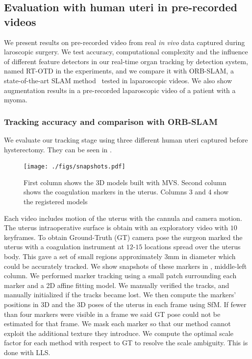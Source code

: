 \subsection{Evaluation with human uteri in pre-recorded videos}
We present results on pre-recorded video from real \emph{in vivo} data captured during laroscopic surgery. We test accuracy, computational complexity and the influence of different feature detectors in our real-time organ tracking by detection system, named RT-OTD in the experiments, and we compare it with ORB-SLAM, a state-of-the-art SLAM method~\cite{orbslam_laparo} tested in laparoscopic videos. We also show augmentation results in a pre-recorded laparoscopic video of a patient with a myoma. 
\subsubsection{Tracking accuracy and comparison with ORB-SLAM}
We evaluate our tracking stage using three different human uteri captured before hysterectomy. They can be seen in .
\begin{figure}[htbp]
  \centering
  \texttt{[image: ./figs/snapshots.pdf]}
\caption{First column shows the 3D models built with MVS. Second column shows the coagulation markers in the uterus. Columns 3 and 4 show the registered models  }
\label{fig:hister}
\end{figure}
 Each video includes motion of the uterus with the cannula and camera motion. The uterus intraoperative surface is obtain with an exploratory video with $10$ keyframes. To obtain Ground-Truth (GT) camera pose the surgeon marked the uterus with a coagulation instrument at $12$-$15$ locations spread over the uterus body. This gave a set of small regions approximately $3$mm in diameter which could be accurately tracked. We show snapshots of these markers in , middle-left column. We performed marker tracking using a small patch surrounding each marker and a 2D affine fitting model.
We manually verified the tracks, and manually initialized if the tracks became lost. We then compute the markers’ positions in 3D and the 3D poses of the uterus in each frame using SfM. If fewer than four markers were visible in a frame we said GT pose could not be estimated for that frame. We mask each marker so that our method cannot exploit the additional texture they introduce. We compute the optimal scale factor for each method with respect to GT to resolve the scale ambiguity. This is done with LLS. 
